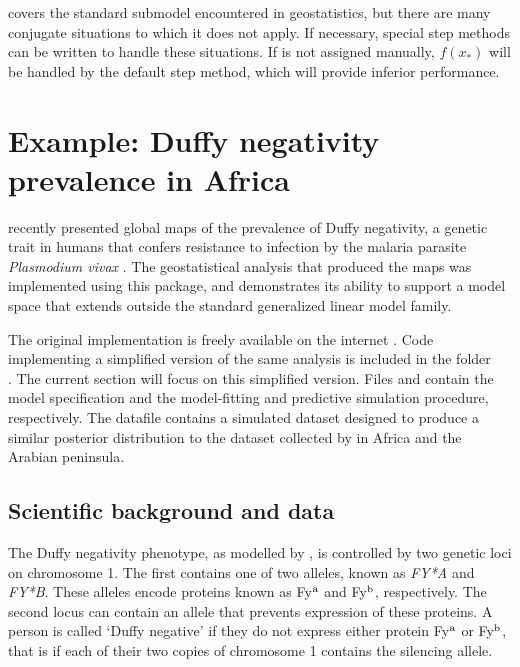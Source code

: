 \documentclass[article]{jss}
\begin{document}
 covers the standard submodel encountered in geostatistics, but there are many conjugate situations to which it does not apply. If necessary, special step methods can be written to handle these situations. If  is not assigned manually, $f(x_*)$ will be handled by the default  step method, which will provide inferior performance. 


\section{Example: Duffy negativity prevalence in Africa}
\label{sec:duffy} 

\cite{Howes} recently presented global maps of the prevalence of Duffy negativity, a genetic trait in humans that confers resistance to infection by the malaria parasite \emph{Plasmodium vivax} \citep{duffy-vivax}. The geostatistical analysis that produced the maps was implemented using this package, and demonstrates its ability to support a model space that extends outside the standard generalized linear model family. 

The original implementation is freely available on the internet \citep{duffy-code, generic-mbg}. Code implementing a simplified version of the same analysis is included in the folder \\. The current section will focus on this simplified version. Files  and  contain the model specification and the model-fitting and predictive simulation procedure, respectively. The datafile  contains a simulated dataset designed to produce a similar posterior distribution to the dataset collected by \cite{Howes} in Africa and the Arabian peninsula. 

\subsection{Scientific background and data}
\label{subsec:duffy-data} 
The Duffy negativity phenotype, as modelled by \cite{Howes}, is controlled by two genetic loci on chromosome 1. The first contains one of two alleles, known as \emph{FY*A} and \emph{FY*B}. These alleles encode proteins known as Fy$^\textup{a}$ and Fy$^\textup{b}$, respectively. The second locus can contain an allele that prevents expression of these proteins. A person is called `Duffy negative' if they do not express either protein Fy$^\textup{a}$ or Fy$^\textup{b}$, that is if each of their two copies of chromosome 1 contains the silencing allele. 
\end{document}
